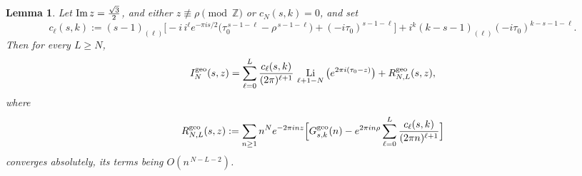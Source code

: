 \documentclass[11pt]{article}
\newtheorem{lemma}[theorem]{Lemma}
\newcommand{\ZZ}{\mathbb{Z}}
\DeclareMathOperator{\Li}{Li}
\begin{document}
\begin{lemma}\label{lem:geoedge}
Let ${\rm Im}\,z=\tfrac{\sqrt3}{2}$, and either $z\not\equiv\rho\!\pmod{\ZZ}$ or
$c_N(s,k)=0$, and set
\begin{equation}\label{eq:geocl}
c_\ell(s,k):=(s-1)_{(\ell)}\Big[-i\,i^{\ell}e^{-\pi is/2}
\big(\tau_0^{\,s-1-\ell}-\rho^{\,s-1-\ell}\big)+(-i\tau_0)^{s-1-\ell}\Big]
+i^{k}(k-s-1)_{(\ell)}(-i\tau_0)^{k-s-1-\ell}.
\end{equation}
Then for every $L\ge N$,
\begin{equation}\label{eq:geoedge}
I^{\rm geo}_N(s,z)=\sum_{\ell=0}^{L}\frac{c_\ell(s,k)}{(2\pi)^{\ell+1}}\,
\Li_{\ell+1-N}\big(e^{2\pi i(\tau_0-z)}\big)+R^{\rm geo}_{N,L}(s,z),
\end{equation}
where
\begin{equation}\label{eq:geoR}
R^{\rm geo}_{N,L}(s,z):=\sum_{n\ge1}n^{N}e^{-2\pi inz}
\Big[G^{\rm geo}_{s,k}(n)-e^{2\pi in\rho}\sum_{\ell=0}^{L}\frac{c_\ell(s,k)}{(2\pi n)^{\ell+1}}\Big]
\end{equation}
converges absolutely, its terms being $O(n^{\,N-L-2})$.
\end{lemma}
\end{document}
